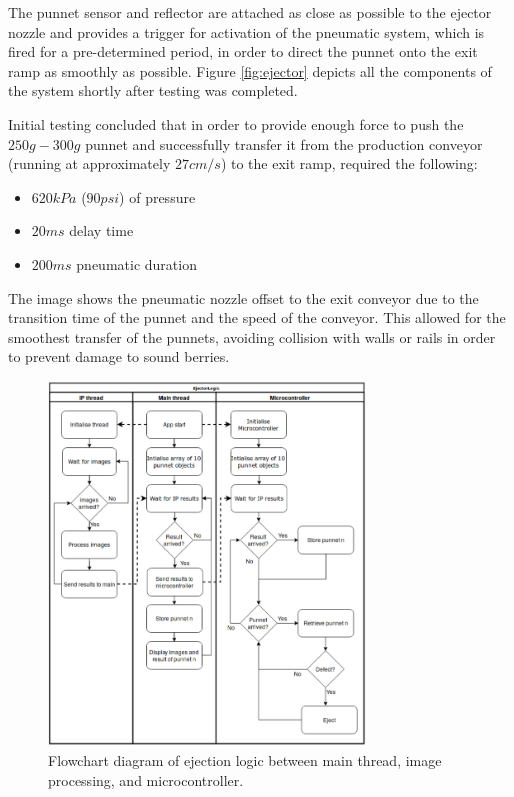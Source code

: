 \documentclass[fleqn,twoside,12pt]{report}
\begin{document}
The punnet sensor and reflector are attached as close as possible to the ejector nozzle and provides a trigger for activation of the pneumatic system, which is fired for a pre-determined period, in order to direct the punnet onto the exit ramp as smoothly as possible. Figure \ref{fig:ejector} depicts all the components of the system shortly after testing was completed.  

Initial testing concluded that in order to provide enough force to push the $250g-300g$ punnet and successfully transfer it from the production conveyor (running at approximately $27cm/s$) to the exit ramp, required the following:
\begin{itemize}
	\item $620kPa$ ($90psi$) of pressure
	\item $20ms$ delay time
	\item $200ms$ pneumatic duration
\end{itemize}

The image shows the pneumatic nozzle offset to the exit conveyor due to the transition time of the punnet and the speed of the conveyor. This allowed for the smoothest transfer of the punnets, avoiding collision with walls or rails in order to prevent damage to sound berries.


\begin{figure}[t]
	\centering
	\includegraphics[width=0.75\textwidth]{micro_logic.png}
	\caption{Flowchart diagram of ejection logic between main thread, image processing, and microcontroller.}
	\label{fig:ejector_logic}
\end{figure}
\end{document}
